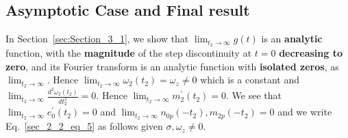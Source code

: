 \documentclass[11pt]{elsarticle}
\begin{document}





\subsection{\label{sec:Section_2_4} \textbf{ Asymptotic Case and Final result} \protect\\  \lowercase{} }



In Section~\ref{sec:Section_3_1}, we show that $\lim_{t_2 \to \infty} g(t)$ is an \textbf{analytic} function, with the \textbf{magnitude} of the step discontinuity at $t=0$ \textbf{decreasing to zero}, and its Fourier transform is an analytic function with \textbf{isolated zeros}, as $\lim_{t_2 \to \infty}$. Hence $\lim_{t_2 \to \infty} \omega_{2}(t_2) = \omega_z \neq 0$ which is a constant and $\lim_{t_2 \to \infty} \frac{d^2 \omega_{2}(t_2)}{dt_2^2} = 0$. Hence $\lim_{t_2 \to \infty} m_2^{'}(t_2) = 0$. We see that $\lim_{t_2 \to \infty} e_0^{'}(t_2)  = 0$ and  $\lim_{t_2 \to \infty} n_{0p}(-t_2), m_{2p}(-t_2) = 0$ and we write Eq.~\ref{sec_2_2_eq_5} as follows given $\sigma,\omega_z \neq 0 $. \\
\end{document}
